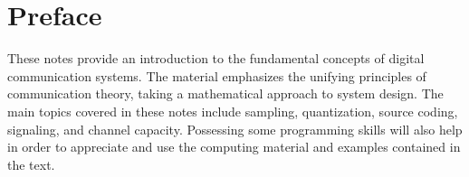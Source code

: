 \chapter{Preface}

These notes provide an introduction to the fundamental concepts of digital communication systems.
The material emphasizes the unifying principles of communication theory, taking a mathematical approach to system design.
The main topics covered in these notes include sampling, quantization, source coding, signaling, and channel capacity. 
Possessing some programming skills will also help in order to appreciate and use the computing material and examples contained in the text.

